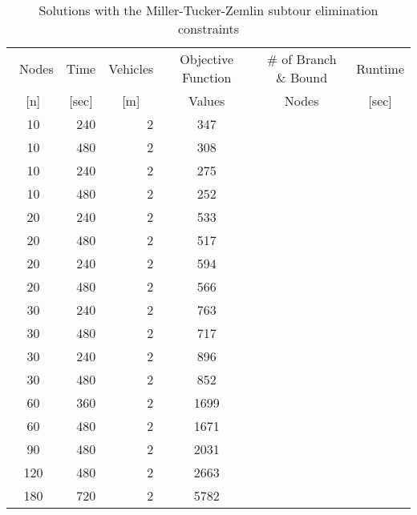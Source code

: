\documentclass[a4paper]{article}
\begin{document}
\begin{table}[h!]
	\centering
	\caption{Solutions with the Miller-Tucker-Zemlin subtour elimination constraints}
		\begin{tabular}{|c|r|r||c|c|c|}
			\hline\
		Nodes & Time & Vehicles	& Objective Function & \# of Branch \& Bound & Runtime\\
   		\multicolumn{1}{|c|}{[n]} & \multicolumn{1}{c|}{[sec]} & \multicolumn{1}{c||}{[m]} & \multicolumn{1}{c|}{Values} & \multicolumn{1}{c|}{Nodes} & \multicolumn{1}{c|}{[sec]} \\
			\hline 
				10	&	240	&	2	&	347		&		&		\\
				10	&	480	&	2	&	308		&		&		\\
				10	&	240	&	2	&	275		&		&		\\
				10	&	480	&	2	&	252		&		&		\\
				20	&	240	&	2	&	533		&		&		\\
				20	&	480	&	2	&	517		&		&		\\
				20	&	240	&	2	&	594		&		&		\\
				20	&	480	&	2	&	566		&		&		\\
				30	&	240	&	2	&	763		&		&		\\
				30	&	480	&	2	&	717		&		&		\\
				30	&	240	&	2	&	896		&		&		\\
				30	&	480	&	2	&	852		&		&		\\
				60	&	360	&	2	&	1699	&		&		\\
				60	&	480	&	2	&	1671	&		&		\\
				90	&	480	&	2	&	2031	&		&		\\
				120	&	480	&	2	&	2663	&		&		\\
				180	&	720	&	2	&	5782	&		&		\\
				
			\hline 
		\end{tabular}
	\label{tab:scf}
\end{table}

 	     	
\end{document}
